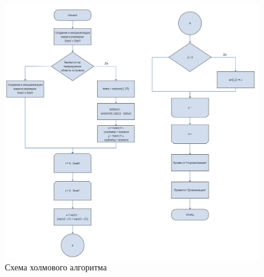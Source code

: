 \documentclass[a4paper, 10pt]{article}
\begin{document}
	\clearpage
	\newpage
	\begin{figure}[h!]
		\centering
		\includegraphics[scale=0.4]{schema_hill}
		\centering\caption{Схема холмового алгоритма}
	\end{figure}
\end{document}
